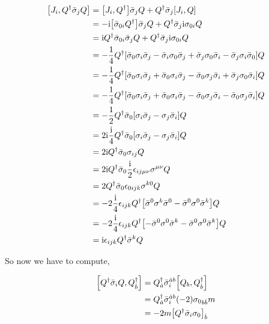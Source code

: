 \begin{align}
    \comm{J_i}{Q^\dagger{\bar\sigma}_jQ}&=\comm{J_i}{Q^\dagger}{\bar\sigma}_jQ+Q^\dagger{\bar\sigma}_j\comm{J_i}{Q}\nonumber\\
    &=-\im\qty[{\bar\sigma}_{0i}Q^\dagger]{\bar\sigma}_jQ+Q^\dagger{\bar\sigma}_j\im{\sigma}_{0i}Q\nonumber\\
    &=\im Q^\dagger{\bar\sigma}_{0i}{\bar\sigma}_jQ+Q^\dagger{\bar\sigma}_j\im{\sigma}_{0i}Q\nonumber\\
    &=-\frac14 Q^\dagger\qty[{\bar\sigma}_0\sigma_i{\bar\sigma}_j-{\bar\sigma}_i\sigma_0{\bar\sigma}_j+
    {\bar\sigma}_j\sigma_0{\bar\sigma}_i-{\bar\sigma}_j\sigma_i{\bar\sigma_0}]Q\nonumber\\
    &=-\frac14Q^\dagger\qty[{\bar\sigma}_0\sigma_i{\bar\sigma}_j+{\bar\sigma}_0\sigma_i{\bar\sigma}_j-{\bar\sigma}_0\sigma_j{\bar\sigma}_i+{\bar\sigma}_j\sigma_0{\bar\sigma}_i]Q\nonumber\\
    &=-\frac14Q^\dagger\qty[{\bar\sigma}_0\sigma_i{\bar\sigma}_j+{\bar\sigma}_0\sigma_i{\bar\sigma}_j-{\bar\sigma}_0\sigma_j{\bar\sigma}_i-{\bar\sigma}_0\sigma_j{\bar\sigma}_i]Q\nonumber\\
    &=-\frac12Q^\dagger{\bar\sigma}_0\qty[\sigma_i{\bar\sigma}_j-\sigma_j{\bar\sigma}_i ]Q\nonumber\\
    &=2\im\frac{\im}{4}Q^\dagger{\bar\sigma}_0\qty[\sigma_i{\bar\sigma}_j-\sigma_j{\bar\sigma}_i ]Q\nonumber\\
    &=2\im Q^\dagger{\bar\sigma}_0\sigma_{ij}Q\nonumber\\
    &=2\im Q^\dagger{\bar\sigma}_0\frac\im2\epsilon_{ij\mu\nu}\sigma^{\mu\nu}Q\nonumber\\
    &=2Q^\dagger{\bar\sigma}_0\epsilon_{0ijk}\sigma^{k0}Q\nonumber\\
    &=-2\frac\im 4\epsilon_{ijk}Q^\dagger\qty[{\bar\sigma}^0\sigma^{k}{\bar\sigma}^0-{\bar\sigma}^0\sigma^0{\bar\sigma^k}]Q\nonumber\\
    &=-2\frac\im 4\epsilon_{ijk}Q^\dagger\qty[-{\bar\sigma}^0\sigma^{0}{\bar\sigma}^k-{\bar\sigma}^0\sigma^0{\bar\sigma^k}]Q\nonumber\\
    &=\im\epsilon_{ijk}Q^\dagger{\bar\sigma^k}Q\nonumber
\end{align}

So now we have to compute,

\begin{align}
    \comm{Q^\dagger{\bar\sigma}_iQ}{Q^\dagger_{\dot b}}&=Q^\dagger_{\dot a}{{\bar\sigma}_i}^{\dot a b}\comm{Q_b}{Q^\dagger_{\dot b}}\nonumber\\
    &=Q^\dagger_{\dot a}{{\bar\sigma}_i}^{\dot a b}\qty(-2){\sigma_0}_{b\dot b}m\nonumber\\
    &=-2m\qty[Q^\dagger{{\bar\sigma}_i}{\sigma_0}]_{\dot b}\nonumber
\end{align}

